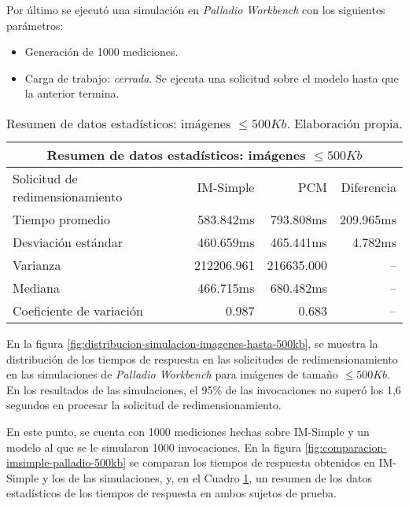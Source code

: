 Por último se ejecutó una simulación en \emph{Palladio Workbench} con los siguientes parámetros:
\begin{itemize}
    \item Generación de 1000 mediciones.
    \item Carga de trabajo: \emph{cerrada}. Se ejecuta una solicitud sobre el modelo hasta que la anterior termina. 
\end{itemize}

\begin{table}
    \centering
    \begin{tabular}{l|r|r|r}
        \toprule[1.5pt]
        \multicolumn{4}{c}{\textbf{Resumen de datos estadísticos: imágenes $\leq 500Kb$}} \\
        \midrule
        Solicitud de redimensionamiento  & IM-Simple & PCM & Diferencia\\
        \midrule
        Tiempo promedio  & 583.842ms & 793.808ms & 209.965ms\\
        Desviación estándar & 460.659ms & 465.441ms & 4.782ms\\
        Varianza & 212206.961 & 216635.000 & -- \\
        Mediana & 466.715ms & 680.482ms & -- \\
        Coeficiente de variación & 0.987 & 0.683 & -- \\                       
        \bottomrule[1.5pt]
    \end{tabular}
    \caption[Resumen de datos estadísticos: imágenes $\leq 500Kb$]{Resumen de datos estadísticos: imágenes $\leq 500Kb$. Elaboración propia.}
    \label{table:datos-estadisticos-hasta-500kb}
\end{table}

En la figura \ref{fig:distribucion-simulacion-imagenes-hasta-500kb}, se muestra la distribución de los tiempos de respuesta en las solicitudes de redimensionamiento en las simulaciones de \emph{Palladio Workbench} para imágenes de tamaño $\leq 500Kb$. En los resultados de las simulaciones, el 95\% de las invocaciones no superó los 1,6 segundos en procesar la solicitud de redimensionamiento.

En este punto, se cuenta con 1000 mediciones hechas sobre IM-Simple y un modelo al que se le simularon 1000 invocaciones. En la figura \ref{fig:comparacion-imsimple-palladio-500kb} se comparan los tiempos de respuesta obtenidos en IM-Simple y los de las simulaciones, y, en el Cuadro \ref{table:datos-estadisticos-hasta-500kb}, un resumen de los datos estadísticos de los tiempos de respuesta en ambos sujetos de prueba.


